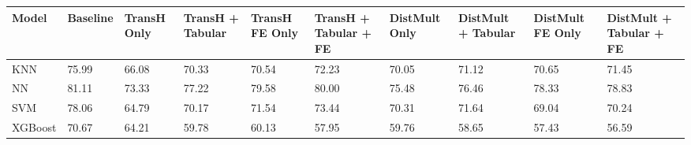 \begin{tabular}{llllllllll}
\toprule
Model & Baseline & TransH Only & TransH + Tabular & TransH FE Only & TransH + Tabular + FE & DistMult Only & DistMult + Tabular & DistMult FE Only & DistMult + Tabular + FE \\
\midrule
KNN & 75.99 & 66.08 & 70.33 & 70.54 & 72.23 & 70.05 & 71.12 & 70.65 & 71.45 \\
NN & 81.11 & 73.33 & 77.22 & 79.58 & 80.00 & 75.48 & 76.46 & 78.33 & 78.83 \\
SVM & 78.06 & 64.79 & 70.17 & 71.54 & 73.44 & 70.31 & 71.64 & 69.04 & 70.24 \\
XGBoost & 70.67 & 64.21 & 59.78 & 60.13 & 57.95 & 59.76 & 58.65 & 57.43 & 56.59 \\
\bottomrule
\end{tabular}
